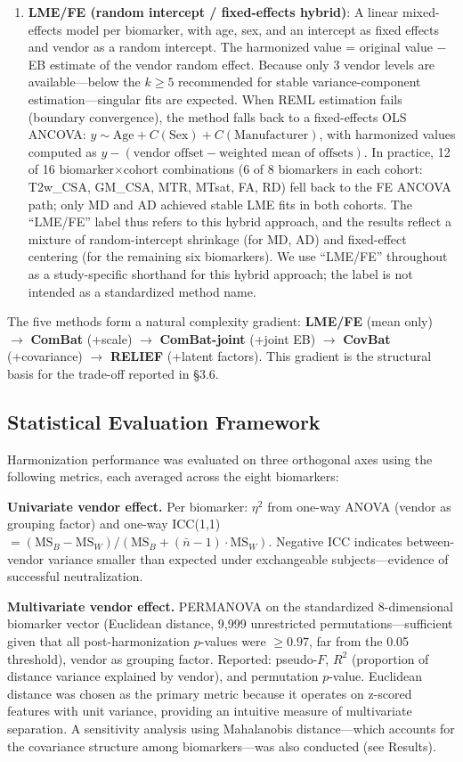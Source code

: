 \documentclass[12pt,a4paper]{article}
\begin{document}
\begin{enumerate}[nosep]
  \item \textbf{LME/FE (random intercept / fixed-effects hybrid)}: A linear mixed-effects model per biomarker, with age, sex, and an intercept as fixed effects and vendor as a random intercept. The harmonized value = original value $-$ EB estimate of the vendor random effect. Because only 3 vendor levels are available---below the $k \geq 5$ recommended for stable variance-component estimation---singular fits are expected. When REML estimation fails (boundary convergence), the method falls back to a fixed-effects OLS ANCOVA: $y \sim \text{Age} + C(\text{Sex}) + C(\text{Manufacturer})$, with harmonized values computed as $y - (\text{vendor offset} - \text{weighted mean of offsets})$. In practice, 12 of 16 biomarker$\times$cohort combinations (6 of 8 biomarkers in each cohort: T2w\_CSA, GM\_CSA, MTR, MTsat, FA, RD) fell back to the FE ANCOVA path; only MD and AD achieved stable LME fits in both cohorts. The ``LME/FE'' label thus refers to this hybrid approach, and the results reflect a mixture of random-intercept shrinkage (for MD, AD) and fixed-effect centering (for the remaining six biomarkers). We use ``LME/FE'' throughout as a study-specific shorthand for this hybrid approach; the label is not intended as a standardized method name.
\end{enumerate}

The five methods form a natural complexity gradient: \textbf{LME/FE} (mean only) $\rightarrow$ \textbf{ComBat} (+scale) $\rightarrow$ \textbf{ComBat-joint} (+joint EB) $\rightarrow$ \textbf{CovBat} (+covariance) $\rightarrow$ \textbf{RELIEF} (+latent factors). This gradient is the structural basis for the trade-off reported in \S 3.6.

\subsection{Statistical Evaluation Framework}

Harmonization performance was evaluated on three orthogonal axes using the following metrics, each averaged across the eight biomarkers:

\textbf{Univariate vendor effect.} Per biomarker: $\eta^2$ from one-way ANOVA (vendor as grouping factor) and one-way ICC(1,1) $= (\text{MS}_B - \text{MS}_W) / (\text{MS}_B + (\bar{n}-1) \cdot \text{MS}_W)$. Negative ICC indicates between-vendor variance smaller than expected under exchangeable subjects---evidence of successful neutralization.

\textbf{Multivariate vendor effect.} PERMANOVA \cite{anderson2001new} on the standardized 8-dimensional biomarker vector (Euclidean distance, 9{,}999 unrestricted permutations---sufficient given that all post-harmonization $p$-values were $\geq 0.97$, far from the 0.05 threshold), vendor as grouping factor. Reported: pseudo-$F$, $R^2$ (proportion of distance variance explained by vendor), and permutation $p$-value. Euclidean distance was chosen as the primary metric because it operates on z-scored features with unit variance, providing an intuitive measure of multivariate separation. A sensitivity analysis using Mahalanobis distance---which accounts for the covariance structure among biomarkers---was also conducted (see Results).
\end{document}

